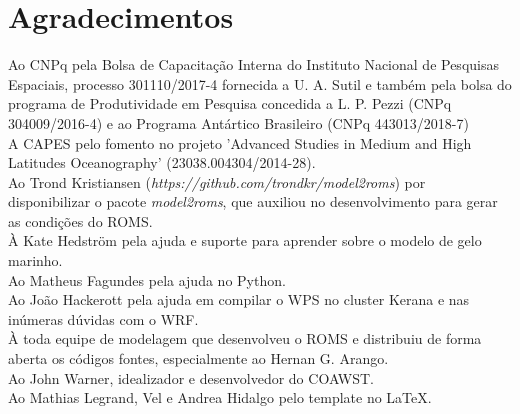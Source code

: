 \chapter*{Agradecimentos}




\noindent Ao CNPq pela Bolsa de Capacitação Interna do Instituto Nacional de Pesquisas Espaciais, processo 301110/2017-4 fornecida a U. A. Sutil e também pela bolsa do programa de Produtividade em Pesquisa concedida a L. P. Pezzi (CNPq 304009/2016-4) e ao Programa Antártico Brasileiro (CNPq 443013/2018-7) \\

\noindent A CAPES pelo fomento no projeto 'Advanced Studies in Medium and High Latitudes Oceanography' (23038.004304/2014-28). \\

\noindent Ao Trond Kristiansen (\textcolor{bleu_cite}{\textit{https://github.com/trondkr/model2roms}}) por disponibilizar o pacote \textit{model2roms}, que auxiliou no desenvolvimento para gerar as condições do ROMS. \\

\noindent À Kate Hedström pela ajuda e suporte para aprender sobre o modelo de gelo marinho. \\

\noindent Ao Matheus Fagundes pela ajuda no Python. \\

\noindent Ao João Hackerott pela ajuda em compilar o WPS no cluster Kerana e nas inúmeras dúvidas com o WRF. \\

\noindent À toda equipe de modelagem que desenvolveu o ROMS e distribuiu de forma aberta os códigos fontes, especialmente ao Hernan G. Arango.\\

\noindent Ao John Warner, idealizador e desenvolvedor do COAWST. \\

\noindent Ao Mathias Legrand, Vel e Andrea Hidalgo pelo template no \LaTeX.
